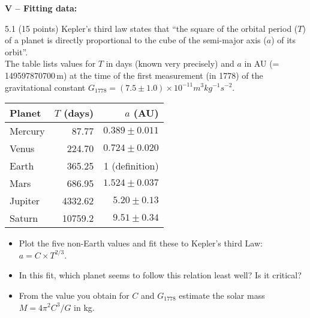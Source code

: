 \documentclass[11pt]{article}
\begin{document}

\noindent
{\bf V -- Fitting data:}
\begin{description}
\begin{minipage}[l]{0.57\textwidth}
\item[5.1] (15 points)
  Kepler's third law states that ``the square of the orbital period ($T$) of a planet is directly
  proportional to the cube of the semi-major axis ($a$) of its orbit''.\\
  The table lists values for $T$ in days (known very precisely) and $a$ in AU (= 149597870700\,m)
  at the time of the first measurement (in 1778) of the gravitational constant
  $G_{1778} = (7.5 \pm 1.0) \times 10^{-11} m^3 kg^{-1} s^{-2}$.
\end{minipage}%
\begin{minipage}[r]{0.0\textwidth}
  \hfill
\end{minipage}%
\begin{minipage}[r]{0.42\textwidth}
  \vspace*{-4ex}
  \begin{center}
  \small
  \begin{tabular}{l|rr}
    \hline
    \hline
    Planet	&$T$ (days)    &$a$ (AU)	  \\
    \hline
    Mercury	&   87.77   	  &$0.389 \pm 0.011$      \\
    Venus	&  224.70	  &$0.724 \pm 0.020$      \\
    Earth	&  365.25         &1 (definition)	  \\
    Mars	&  686.95	  &$1.524 \pm 0.037$      \\
    Jupiter	& 4332.62	  &$5.20 \pm 0.13$        \\
    Saturn	&10759.2	  &$9.51 \pm 0.34$        \\
    \hline
    \hline
  \end{tabular}
  \end{center}
\end{minipage}%
  \vspace*{-1ex}
  \begin{itemize}
    \item Plot the five non-Earth values and fit these to Kepler's third Law: $a = C \times T^{2/3}$.
    \item In this fit, which planet seems to follow this relation least well? Is it critical?
    \item From the value you obtain for $C$ and 
       $G_{1778}$ estimate the solar mass $M = 4\pi^2 C^3 / G$ in kg.

\end{itemize}
\end{description}
\end{document}
